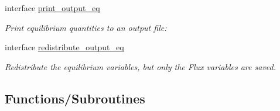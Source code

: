 \begin{DoxyCompactItemize}
interface \hyperlink{interfaceeq__ops_1_1print__output__eq}{print\+\_\+output\+\_\+eq}
\begin{DoxyCompactList}\small\item\em Print equilibrium quantities to an output file\+: \end{DoxyCompactList}\item 
interface \hyperlink{interfaceeq__ops_1_1redistribute__output__eq}{redistribute\+\_\+output\+\_\+eq}
\begin{DoxyCompactList}\small\item\em Redistribute the equilibrium variables, but only the Flux variables are saved. \end{DoxyCompactList}\end{DoxyCompactItemize}
\subsection*{Functions/\+Subroutines}
